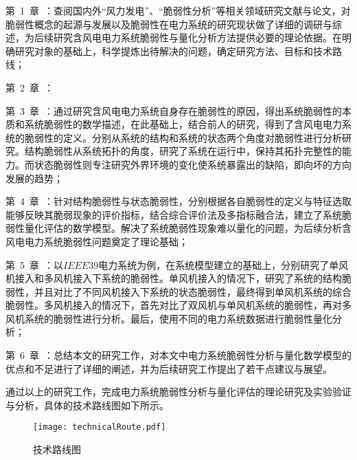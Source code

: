 第~1~章~：查阅国内外“风力发电”、“脆弱性分析”等相关领域研究文献与论文，对脆弱性概念的起源与发展以及脆弱性在电力系统的研究现状做了详细的调研与综述，为后续研究含风电电力系统脆弱性与量化分析方法提供必要的理论依据。在明确研究对象的基础上，科学提炼出待解决的问题，确定研究方法、目标和技术路线；

第~2~章~：

第~3~章~：通过研究含风电电力系统自身存在脆弱性的原因，得出系统脆弱性的本质和系统脆弱性的数学描述，在此基础上，结合前人的研究，得到了含风电电力系统的脆弱性的定义。分别从系统的结构和系统的状态两个角度对脆弱性进行分析研究。结构脆弱性从系统拓扑的角度，研究了系统在运行中，保持其拓扑完整性的能力。而状态脆弱性则专注研究外界环境的变化使系统暴露出的缺陷，即向坏的方向发展的趋势；

第~4~章~：针对结构脆弱性与状态脆弱性，分别根据各自脆弱性的定义与特征选取能够反映其脆弱现象的评价指标，结合综合评价法及多指标融合法，建立了系统脆弱性量化评估的数学模型。解决了系统脆弱性现象难以量化的问题，为后续分析含风电电力系统脆弱性问题奠定了理论基础；

第~5~章~：以$IEEE39$电力系统为例，在系统模型建立的基础上，分别研究了单风机接入和多风机接入下系统的脆弱性。单风机接入的情况下，研究了系统的结构脆弱性，并且对比了不同风机接入下系统的状态脆弱性，最终得到单风机系统的综合脆弱性。多风机接入的情况下，首先对比了双风机与单风机系统的脆弱性，再对多风机系统的脆弱性进行分析。最后，使用不同的电力系统数据进行脆弱性量化分析；

第~6~章~：总结本文的研究工作，对本文中电力系统脆弱性分析与量化数学模型的优点和不足进行了详细的阐述，并为后续研究工作提出了若干点建议与展望。

通过以上的研究工作，完成电力系统脆弱性分析与量化评估的理论研究及实验验证与分析，具体的技术路线图如下所示。
\begin{figure}[H] %
  \centering
  \texttt{[image: technicalRoute.pdf]}
  \caption{技术路线图}
  \label{fig:technicalRoute}
\end{figure}
